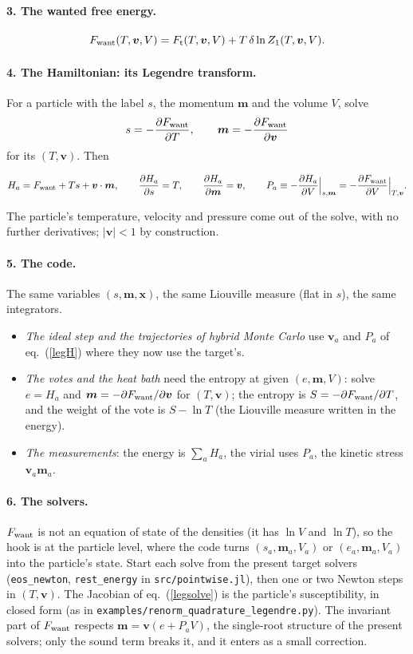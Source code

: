 \documentclass[11pt,aps,preprint,nofootinbib,superscriptaddress,tightenlines]{revtex4-2}
\def\st{\begin{equation}}
\def\stp{\end{equation}}
\def\Eq#1{eq.~(\ref{#1})}
\let\oldparagraph\paragraph
\renewcommand{\paragraph}{\par\bigskip\oldparagraph}
\begin{document}
\paragraph{3. The wanted free energy.}
\st
F_{\rm want}(T,\bm v,V)=F_{\rm t}(T,\bm v,V)+T\,\delta\ln Z_1(T,\bm v,V) .
\stp

\paragraph{4. The Hamiltonian: its Legendre transform.}  For a particle with the label $s$, the momentum $\bm m$ and the volume $V$, solve
\st
s=-\frac{\partial F_{\rm want}}{\partial T},\qquad \bm m=-\frac{\partial F_{\rm want}}{\partial\bm v}
\label{legsolve}
\stp
for its $(T,\bm v)$.  Then
\begin{keyeq}
\st
H_a=F_{\rm want}+Ts+\bm v\cdot\bm m,\qquad \frac{\partial H_a}{\partial s}=T,\qquad \frac{\partial H_a}{\partial\bm m}=\bm v,\qquad
P_a\equiv-\frac{\partial H_a}{\partial V}\Big|_{s,\bm m}=-\frac{\partial F_{\rm want}}{\partial V}\Big|_{T,\bm v} .
\label{legH}
\stp
\end{keyeq}
The particle's temperature, velocity and pressure come out of the solve, with no further derivatives; $|\bm v|<1$ by construction.

\paragraph{5. The code.}  The same variables $(s,\bm m,\bm x)$, the same Liouville measure (flat in $s$), the same integrators.
\begin{itemize}
\item \emph{The ideal step and the trajectories of hybrid Monte Carlo} use $\bm v_a$ and $P_a$ of \Eq{legH} where they now use the target's.
\item \emph{The votes and the heat bath} need the entropy at given $(e,\bm m,V)$: solve $e=H_a$ and $\bm m=-\partial F_{\rm want}/\partial\bm v$ for $(T,\bm v)$; the entropy is
  $S=-\partial F_{\rm want}/\partial T$, and the weight of the vote is $S-\ln T$ (the Liouville measure written in the energy).
\item \emph{The measurements}: the energy is $\sum_aH_a$, the virial uses $P_a$, the kinetic stress $\bm v_a\bm m_a$.
\end{itemize}

\paragraph{6. The solvers.}  $F_{\rm want}$ is not an equation of state of the densities (it has $\ln V$ and $\ln T$), so the hook is at the particle level, where the code
turns $(s_a,\bm m_a,V_a)$ or $(e_a,\bm m_a,V_a)$ into the particle's state.  Start each solve from the present target solvers (\texttt{eos\_newton}, \texttt{rest\_energy} in
\nolinkurl{src/pointwise.jl}), then one or two Newton steps in $(T,\bm v)$.  The Jacobian of \Eq{legsolve} is the particle's susceptibility, in closed form (as in
\nolinkurl{examples/renorm_quadrature_legendre.py}).  The invariant part of $F_{\rm want}$ respects $\bm m=\bm v(e+P_aV)$, the single-root structure of the present solvers;
only the sound term breaks it, and it enters as a small correction.
\end{document}
